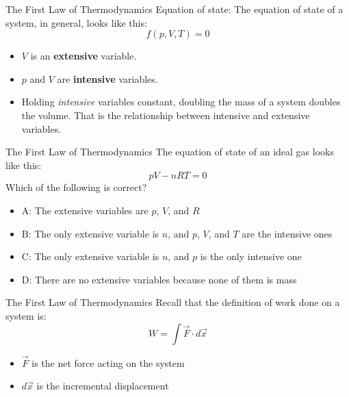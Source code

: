 \documentclass{beamer}
\begin{document}
\begin{frame}{The First Law of Thermodynamics}
\alert{Equation of state}: The equation of state of a system, in general, looks like this:
\begin{equation}
f(p,V,T) = 0
\end{equation}
\begin{itemize}
\item $V$ is an \textbf{extensive} variable.
\item $p$ and $V$ are \textbf{intensive} variables.
\item Holding \textit{intensive} variables constant, doubling the mass of a system doubles the volume.  That is the relationship between intensive and extensive variables.
\end{itemize}
\end{frame}

\begin{frame}{The First Law of Thermodynamics}
\alert{The equation of state of an ideal gas} looks like this:
\begin{equation}
pV - nRT = 0
\end{equation}
Which of the following is correct?
\begin{itemize}
\item A: The extensive variables are $p$, $V$, and $R$
\item B: The only extensive variable is $n$, and $p$, $V$, and $T$ are the intensive ones
\item C: The only extensive variable is $n$, and $p$ is the only intensive one
\item D: There are no extensive variables because none of them is mass
\end{itemize}
\end{frame}

\begin{frame}{The First Law of Thermodynamics}
Recall that the definition of work done on a system is:
\begin{equation}
W = \int \vec{F} \cdot d\vec{x}
\label{eq:work}
\end{equation}
\begin{itemize}
\item $\vec{F}$ is the net force acting on the system
\item $d\vec{x}$ is the incremental displacement
\end{itemize}
\end{frame}
\end{document}
